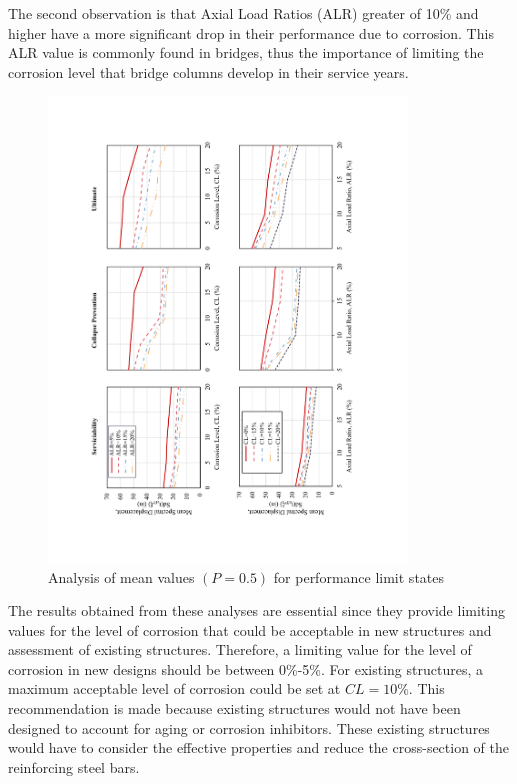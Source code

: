 The second observation is that Axial Load Ratios (ALR) greater of 10\% and higher have a more significant drop in their performance due to corrosion. This ALR value is commonly found in bridges, thus the importance of limiting the corrosion level that bridge columns develop in their service years.

\begin{figure}[htbp]
	\centering
	\includegraphics[width=0.85\textwidth]{VAC Thesis 2.0/Chapter-5/figs/Analysis_of_Mean_SDs.pdf}
	\caption{Analysis of mean values $(P=0.5)$ for performance limit states}
	\label{fig:mean_prob_vs_CL}
\end{figure}

The results obtained from these analyses are essential since they provide limiting values for the level of corrosion that could be acceptable in new structures and assessment of existing structures. Therefore, a limiting value for the level of corrosion in new designs should be between 0\%-5\%. For existing structures, a maximum acceptable level of corrosion could be set at $CL=10\%$. This recommendation is made because existing structures would not have been designed to account for aging or corrosion inhibitors. These existing structures would have to consider the effective properties and reduce the cross-section of the reinforcing steel bars. 

